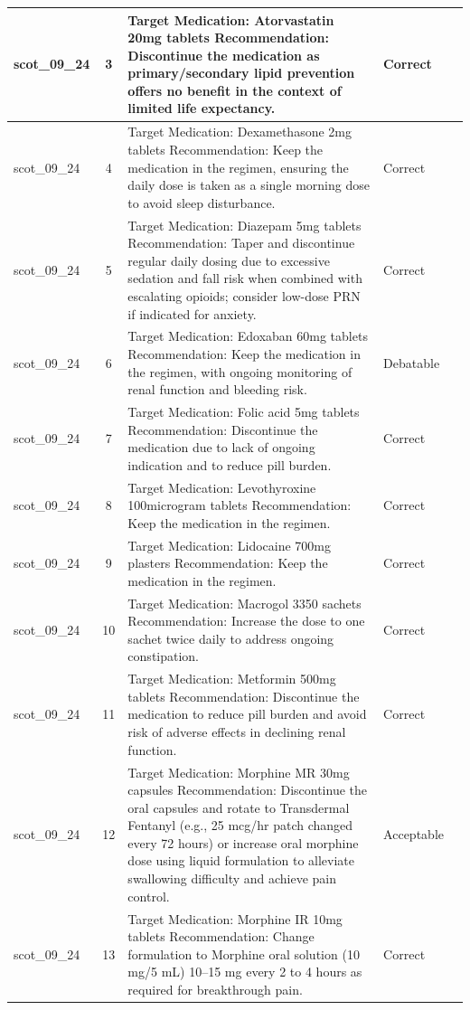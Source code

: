 \begin{longtable}{|p{1.45cm}|c|p{10.2cm}|p{1.55cm}|p{2.3cm}|}
\hline
scot\_09\_24 & 3 & Target Medication: Atorvastatin 20mg tablets Recommendation: Discontinue the medication as primary/secondary lipid prevention offers no benefit in the context of limited life expectancy. & Correct &  \\
\hline
scot\_09\_24 & 4 & Target Medication: Dexamethasone 2mg tablets Recommendation: Keep the medication in the regimen, ensuring the daily dose is taken as a single morning dose to avoid sleep disturbance. & Correct &  \\
\hline
scot\_09\_24 & 5 & Target Medication: Diazepam 5mg tablets Recommendation: Taper and discontinue regular daily dosing due to excessive sedation and fall risk when combined with escalating opioids; consider low-dose PRN if indicated for anxiety. & Correct &  \\
\hline
scot\_09\_24 & 6 & Target Medication: Edoxaban 60mg tablets Recommendation: Keep the medication in the regimen, with ongoing monitoring of renal function and bleeding risk. & Debatable &  \\
\hline
scot\_09\_24 & 7 & Target Medication: Folic acid 5mg tablets Recommendation: Discontinue the medication due to lack of ongoing indication and to reduce pill burden. & Correct &  \\
\hline
scot\_09\_24 & 8 & Target Medication: Levothyroxine 100microgram tablets Recommendation: Keep the medication in the regimen. & Correct &  \\
\hline
scot\_09\_24 & 9 & Target Medication: Lidocaine 700mg plasters Recommendation: Keep the medication in the regimen. & Correct &  \\
\hline
scot\_09\_24 & 10 & Target Medication: Macrogol 3350 sachets Recommendation: Increase the dose to one sachet twice daily to address ongoing constipation. & Correct &  \\
\hline
scot\_09\_24 & 11 & Target Medication: Metformin 500mg tablets Recommendation: Discontinue the medication to reduce pill burden and avoid risk of adverse effects in declining renal function. & Correct &  \\
\hline
scot\_09\_24 & 12 & Target Medication: Morphine MR 30mg capsules Recommendation: Discontinue the oral capsules and rotate to Transdermal Fentanyl (e.g., 25 mcg/hr patch changed every 72 hours) or increase oral morphine dose using liquid formulation to alleviate swallowing difficulty and achieve pain control. & Acceptable &  \\
\hline
scot\_09\_24 & 13 & Target Medication: Morphine IR 10mg tablets Recommendation: Change formulation to Morphine oral solution (10 mg/5 mL) 10–15 mg every 2 to 4 hours as required for breakthrough pain. & Correct &  \\

\end{longtable}

